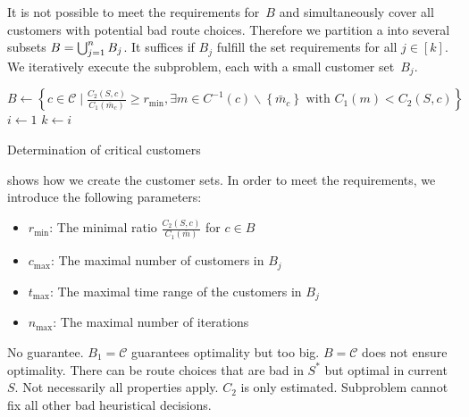 It is not possible to meet the requirements for~$B$ and simultaneously cover all customers with potential bad route choices. Therefore we partition a into several subsets ${B=\bigcup_{j=1}^n B_j}$. It suffices if $B_j$ fulfill the set requirements for all ${j\in[k]}$. We iteratively execute the subproblem, each with a small customer set~$B_j$.

\begin{algorithm}[htb]
	\SetAlgoLined
	$B\gets\left\{c\in\mathcal{C}\mid\frac{C_2(S,c)}{C_1\left(\bar{m}_c\right)}\geq r_{\min}, \exists m\in C^{-1}(c)\backslash\left\{\bar{m}_c\right\} \text{ with } C_1(m)<C_2(S,c)\right\}$\;
	$i\gets 1$\;
	$k\gets i$\;
	\caption{Determination of critical customers}
	\label{alg:critical_customers}
\end{algorithm}

 shows how we create the customer sets. In order to meet the requirements, we introduce the following parameters:
\begin{itemize}
	\item{$r_{\min}$:} The minimal ratio $\frac{C_2(S,c)}{C_1\left(\bar{m}\right)}$ for ${c\in B}$
	\item{$c_{\max}$:} The maximal number of customers in $B_j$
	\item{$t_{\max}$:} The maximal time range of the customers in $B_j$
	\item{$n_{\max}$:} The maximal number of iterations
\end{itemize}

No guarantee. $B_1=\mathcal{C}$ guarantees optimality but too big. $B=\mathcal{C}$ does not ensure optimality. There can be route choices that are bad in $S^*$ but optimal in current $S$. Not necessarily all properties apply. $C_2$ is only estimated. Subproblem cannot fix all other bad heuristical decisions.

